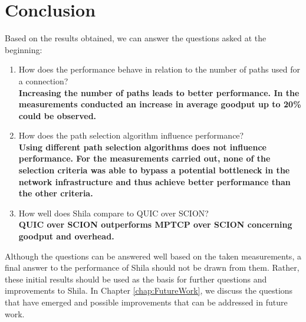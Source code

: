 \section{Conclusion}

Based on the results obtained, we can answer the questions asked at the beginning:

{\small \begin{enumerate}
	\item How does the performance behave in relation to the number of paths used for a connection? \smallskip\\ \textbf{Increasing the number of paths leads to better performance. In the measurements conducted an increase in average goodput up to 20\% could be observed.}
	\item How does the path selection algorithm influence performance?
	\smallskip\\ \textbf{Using different path selection algorithms does not influence performance. For the measurements carried out, none of the selection criteria was able to bypass a potential bottleneck in the network infrastructure and thus achieve better performance than the other criteria.}
	\item How well does Shila compare to QUIC over SCION?
	\smallskip\\ \textbf{QUIC over SCION outperforms MPTCP over SCION concerning goodput and overhead.}
\end{enumerate}}

Although the questions can be answered well based on the taken measurements, a final answer to the performance of Shila should not be drawn from them. Rather, these initial results should be used as the basis for further questions and improvements to Shila. In Chapter \ref{chap:FutureWork}, we discuss the questions that have emerged and possible improvements that can be addressed in future work.  